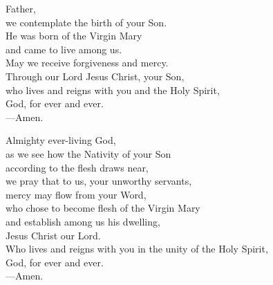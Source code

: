 \prayer


\begin{prayerverse}
Father,\\
we contemplate the birth of your Son.\\
He was born of the Virgin Mary\\
and came to live among us.\\
May we receive forgiveness and mercy.\\
Through our Lord Jesus Christ, your Son, \\
who lives and reigns with you and the Holy Spirit, \\
God, for ever and ever.\\
{\color{red}---\thinspace}Amen.
\end{prayerverse}


\begin{prayerverse}
Almighty ever-living God,\\
as we see how the Nativity of your Son\\
according to the flesh draws near,\\
we pray that to us, your unworthy servants,\\
mercy may flow from your Word,\\
who chose to become flesh of the Virgin Mary\\
and establish among us his dwelling,\\
Jesus Christ our Lord.\\
Who lives and reigns with you in the unity of the Holy Spirit,\\
God, for ever and ever.\\
{\color{red}---\thinspace}Amen.

\end{prayerverse}


